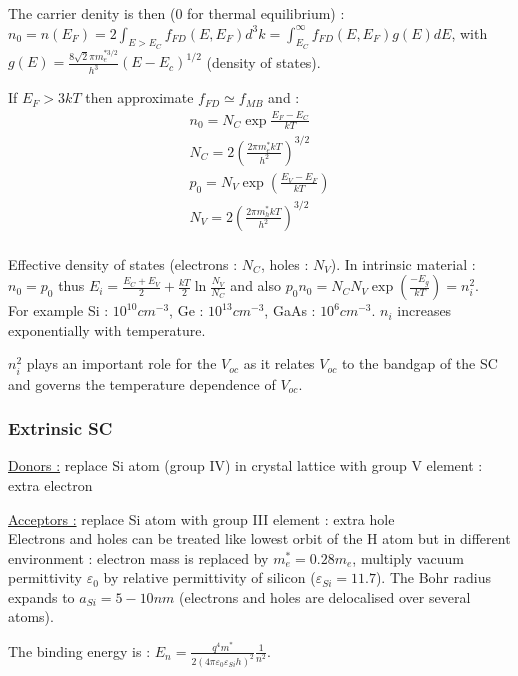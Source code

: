 \documentclass[../main.tex]{subfiles}
\begin{document}
The carrier denity is then (0 for thermal equilibrium) : $n_0 = n(E_F) = 2\int_{E>E_C} f_{FD}(E,E_F) d^3k = \int_{E_C}^\infty f_{FD}(E,E_F) g(E) dE$, with $g(E) = \frac{8\sqrt{2} \pi m_e^{*3/2}}{h^3} (E-E_c)^{1/2}$ (density of states).

If $E_F>3kT$ then approximate $f_{FD} \simeq f_{MB}$ and :
\begin{equation}
    \begin{gathered}
        n_0 = N_C\exp{\frac{E_F-E_C}{kT}}\\
        N_C = 2(\frac{2\pi m_e^*kT}{h^2})^{3/2}\\
        p_0 = N_V \exp(\frac{E_V-E_F}{kT})\\
        N_V = 2 (\frac{2\pi m_h^*kT}{h^2})^{3/2}\\
    \end{gathered}
\end{equation}

Effective density of states (electrons : $N_C$, holes : $N_V$). In intrinsic material : $n_0 = p_0$ thus $E_i = \frac{E_C + E_V}{2} + \frac{kT}{2} \ln \frac{N_V}{N_C}$ and also $p_0n_0 = N_CN_V \exp(\frac{-E_g}{kT}) = n_i^2$.\\
For example Si : $10^10 cm^{-3}$, Ge : $10^{13} cm^{-3}$, GaAs : $10^6 cm^{-3}$. $n_i$ increases exponentially with temperature. 

\warning $n_i^2$ plays an important role for the $V_{oc}$ as it relates $V_{oc}$ to the bandgap of the SC and governs the temperature dependence of $V_{oc}$.\\


\subsubsection{Extrinsic SC}

\quad \underline{Donors :} replace Si atom (group IV) in crystal lattice with group V element : extra electron

\quad \underline{Acceptors :} replace Si atom with group III element : extra hole\\

Electrons and holes can be treated like lowest orbit of the H atom but in different environment : electron mass is replaced by $m_e^*= 0.28m_e$, multiply vacuum permittivity $\varepsilon_0$ by relative permittivity of silicon ($\varepsilon_{Si} = 11.7$). The Bohr radius expands to $a_{Si} = 5-10nm$ (electrons and holes are delocalised over several atoms).

The binding energy is : $E_n = \frac{q^4 m^*}{2(4\pi \varepsilon_0 \varepsilon_{Si} h)^2} \frac{1}{n^2}$.\\
\end{document}
